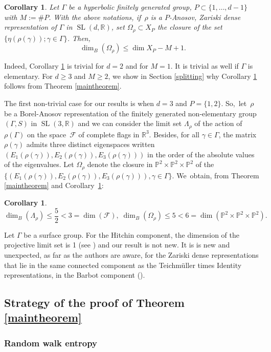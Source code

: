 \documentclass[10pt]{amsart}
\newtheorem{corollary}[theorem]{Corollary}
\newcommand{\R}{\mathbb{R}}
\newcommand{\PP}{\mathbb{P}}
\newcommand{\F}{\mathcal{F}}
\let\G\Gamma
\let\g\gamma
\let\Om\Omega
\let\x\times
\DeclareMathOperator{\SL}{SL}
\providecommand{\skpt}{\par\smallskip\noindent}
\let\Subsection\subsection\let\Subsubsection\subsubsection
\begin{document}
\begin{corollary}\label{eigenvectors} Let \(\G\) be a hyperbolic finitely generated group, \hbox{\(P \!\subset\! \lbrace 1,\ldots, d-1 \rbrace\)} with \(M:= \# P \).
With the above notations, if~\(\rho \) is a \(P\)-Anosov, Zariski dense representation of \(\G\) in \(\SL(d,\R) \), set \(\Om_\rho \subset X_P \) the closure of the set \(\{ \eta (\rho (\g)); \g \in \G\}\). Then,
\[
\dim_B(\Om_\rho) \le \dim X_P -M +1.
\]
\end{corollary}

Indeed, Corollary \ref{eigenvectors} is trivial for \(d= 2\) and for \(M=1\). It is trivial as well if \(\G\) is elementary. For \(d \ge 3\) and \(M\ge 2\), we show in Section \ref{splitting} why Corollary \ref{eigenvectors} follows from Theorem \ref{maintheorem}.

The first non-trivial case for our results is when \(d=3\) and \(P= \{1,2\}\). So,~let~\(\rho \) be a Borel-Anosov representation of the finitely generated non-elementary group \((\G, S)\) in \(\SL(3,\R) \) and we can consider the limit set \(\Lambda_\rho \) of the action of \(\rho(\G) \) on the space~\(\F\) of complete flags in \(\R^3\). Besides, for all \(\g \in \G\), the matrix \(\rho(\g)\) admits three distinct eigenspaces written \((E_1 (\rho(\g)), E_2 (\rho(\g)), E_3 (\rho(\g)))\) in the order of the absolute values of the eigenvalues. Let \(\Om_\rho \) denote the closure in \(\PP^2\x\PP^2\x\PP^2\) of the \(\{(E_1 (\rho(\g)), E_2 (\rho(\g)), E_3 (\rho(\g))), \g \in \G \} \). We~obtain, from Theorem \ref{maintheorem} and Corollary~\ref{eigenvectors}:

\skpt
\begin{corollary}\label{2.5, 5}\mbox{}\vspace*{-\baselineskip}
\[
\dim_B(\Lambda_\rho) \le \frac{5}{2} < 3 = \dim(\F), \; \dim_B(\Om_\rho) \le 5 < 6 = \dim (\PP^2\x\PP^2\x\PP^2).
\]
\end{corollary}
Let \(\G\) be a surface group. For the Hitchin component, the dimension of the projective limit set is 1 (see \cite{Lab06}) and our result is not new. It is is new and unexpected, as far as the authors are aware, for the Zariski dense representations that lie in the same connected component as the Teichmüller times Identity representations, \ie in the Barbot component (\cf \cite{barbot}).

\Subsection{Strategy of the proof of Theorem \ref{maintheorem}}

\subsubsection{Random walk entropy}
\end{document}
